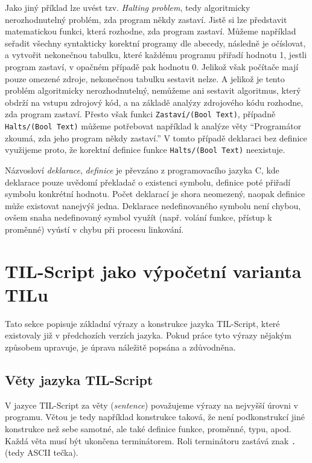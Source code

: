 Jako jiný příklad lze uvést tzv. \textit{Halting problem}, tedy algoritmicky nerozhodnutelný
problém, zda program někdy zastaví. Jistě si lze představit matematickou funkci, která rozhodne,
zda program zastaví. Můžeme například seřadit všechny syntakticky korektní programy dle abecedy,
následně je očíslovat, a vytvořit nekonečnou tabulku, které každému programu přiřadí hodnotu 1,
jestli program zastaví, v opačném případě pak hodnotu 0. Jelikož však počítače mají pouze omezené
zdroje, nekonečnou tabulku sestavit nelze. A jelikož je tento problém algoritmicky nerozhodnutelný,
nemůžeme ani sestavit algoritmus, který obdrží na vstupu zdrojový kód, a na základě analýzy
zdrojového kódu rozhodne, zda program zastaví. Přesto však funkci \lstinline{Zastaví/(Bool Text)},
případně \lstinline{Halts/(Bool Text)} můžeme potřebovat například k analýze věty ``Programátor
zkoumá, zda jeho program někdy zastaví.'' V tomto případě deklaraci bez definice využijeme proto,
že korektní definice funkce \lstinline{Halts/(Bool Text)} neexistuje.

Názvosloví \textit{deklarace}, \textit{definice} je převzáno z programovacího jazyka C, kde
deklarace pouze uvědomí překladač o existenci symbolu, definice poté přiřadí symbolu konkrétní
hodnotu. Počet deklarací je shora neomezený, naopak definice může existovat nanejvýš jedna.
Deklarace nedefinovaného symbolu není chybou, ovšem snaha nedefinovaný symbol využít (např. volání
funkce, přístup k proměnné) vyústí v chybu při procesu linkování.

\section{TIL-Script jako výpočetní varianta TILu}

Tato sekce popisuje základní výrazy a konstrukce jazyka TIL-Script, které existovaly již
v předchozích verzích jazyka. Pokud práce tyto výrazy nějakým způsobem upravuje, je úprava náležitě
popsána a zdůvodněna.

\subsection{Věty jazyka TIL-Script}

V jazyce TIL-Script za věty (\textit{sentence}) považujeme výrazy na nejvyšší úrovni v programu.
Větou je tedy například konstrukce taková, že není podkonstrukcí jiné konstrukce než sebe samotné,
ale také definice funkce, proměnné, typu, apod. Každá věta musí být ukončena terminátorem. Roli
terminátoru zastává znak \lstinline{.} (tedy ASCII tečka).

